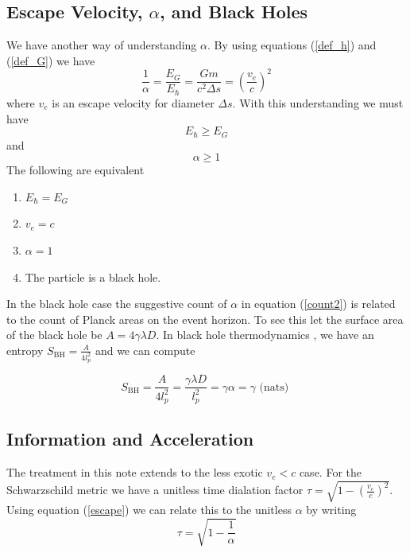 \documentclass[12pt,a4paper]{article}
\begin{document}
\subsection{Escape Velocity, $\alpha$, and Black Holes}
We have another way of understanding $\alpha$.  By using equations (\ref{def_h}) and (\ref{def_G}) we have
\begin{equation}
\label{escape}
  \frac{1}{\alpha} = \frac{E_G}{E_\hslash} = \frac{Gm}{c^2\Delta s} = \left(\frac{v_e}{c}\right)^2
\end{equation}
where $v_e$ is an escape velocity for diameter $\Delta s$.  With this understanding we must have
\begin{equation}
\label{ine}
   E_\hslash \ge E_G
\end{equation}
and
\begin{equation}
\label{alphaone}
  \alpha \ge 1 
\end{equation}
The following are equivalent
\begin{enumerate}
\item $E_\hslash = E_G$
\item $v_e = c$
\item $\alpha = 1$
\item The particle is a black hole.
\end{enumerate}
In the black hole case the suggestive count of $\alpha$ in equation (\ref{count2}) is related to the count of Planck areas on the event horizon.  To see this let the surface area of the black hole be $A = 4 \gamma \lambda D$.  In black hole thermodynamics \cite{bekenstein}, we have an entropy $S_\text{BH} = \frac{A}{4 l_p^2}$ and we can compute

\[
  S_\text{BH} = \frac{A}{4 l_p^2} = \frac{\gamma \lambda D}{l_p^2} = \gamma \alpha = \gamma \text{ (nats) }
\]

\subsection{Information and Acceleration}

The treatment in this note extends to the less exotic $v_e < c$ case.  For the Schwarzschild metric we have a unitless time dialation factor $\tau = \sqrt{1 - \left(\frac{v_e}{c}\right)^2}$.  Using equation (\ref{escape}) we can relate this to the unitless $\alpha$ by writing
\[
\tau = \sqrt{1 - \frac{1}{\alpha}}
\]
\end{document}
